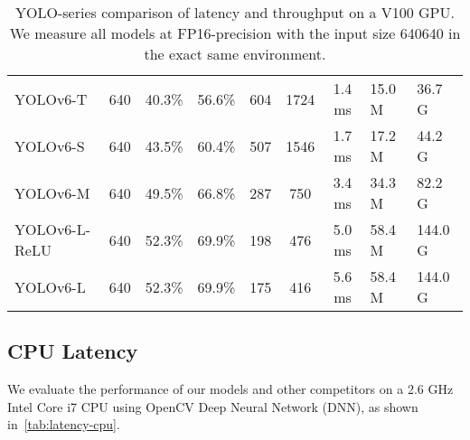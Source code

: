\documentclass[10pt,twocolumn,letterpaper]{article}
\begin{document}
\begin{table}[ht]
{\begin{tabular}{l|HHHc|c|cHH}
      YOLOv6-T & 640 & 40.3\% & 56.6\% & 604 & 1724 & 1.4 ms & 15.0 M & 36.7 G \\
      YOLOv6-S & 640 & 43.5\% & 60.4\% & 507 & 1546 &1.7 ms & 17.2 M & 44.2 G \\
      YOLOv6-M & 640 & 49.5\% & 66.8\%& 287 & 750 &3.4 ms & 34.3 M & 82.2 G \\
      YOLOv6-L-ReLU & 640 & 52.3\% & 69.9\% & 198  & 476 & 5.0 ms & 58.4 M & 144.0 G \\
      YOLOv6-L & 640 & 52.3\% & 69.9\% & 175  & 416 & 5.6 ms & 58.4 M & 144.0 G \\
      \bottomrule
		\end{tabular}
	}
	\caption{
    YOLO-series comparison of latency and throughput on a V100 GPU. We measure all models at FP16-precision with the input size 640640 in the exact same environment.
	}
	\label{tab:latency-qps-v100}
\end{table}

\subsection{CPU Latency}
We evaluate the performance of our models and other competitors on a 2.6 GHz  Intel Core i7 CPU using OpenCV Deep Neural Network (DNN), as shown in~\cref{tab:latency-cpu}.
\end{document}
